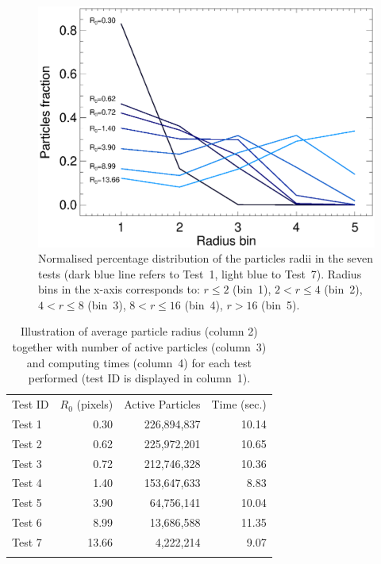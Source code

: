 \documentclass[preprint,5pt]{elsarticle}
\begin{document}
\begin{figure}
\includegraphics[scale=0.5]{radii.eps}
\caption{Normalised percentage distribution of the particles radii in the seven tests (dark blue line refers to Test~1, light blue to Test~7). Radius bins in the x-axis corresponds to: $r\le 2$ (bin~1), $2<r\le 4$ (bin~2), $4<r\le 8$ (bin~3), $8<r\le 16$ (bin~4), $r>16$ (bin~5). 
}
\label{fig:radii}
\end{figure}

\begin{table}
\label{tab:radius}
\begin{tabular}{lrrr}
\hline\noalign{\smallskip}
Test ID & $R_0$ (pixels) & Active Particles & Time (sec.) \\
\noalign{\smallskip} \hline \noalign{\smallskip}
Test 1  & 0.30   & 226,894,837  & 10.14 \\
Test 2  & 0.62   & 225,972,201  & 10.65 \\
Test 3  & 0.72   & 212,746,328  & 10.36 \\
Test 4  & 1.40   & 153,647,633  & 8.83 \\
Test 5  & 3.90   & 64,756,141   & 10.04 \\
Test 6  & 8.99   & 13,686,588   & 11.35 \\
Test 7  & 13.66  & 4,222,214    & 9.07 \\
\noalign{\smallskip} \hline
\end{tabular}
\caption{Illustration of average particle radius (column 2) together with number of active particles (column~3) and computing times (column~4) for each test performed (test ID is displayed in column~1).}
\end{table}
\end{document}
